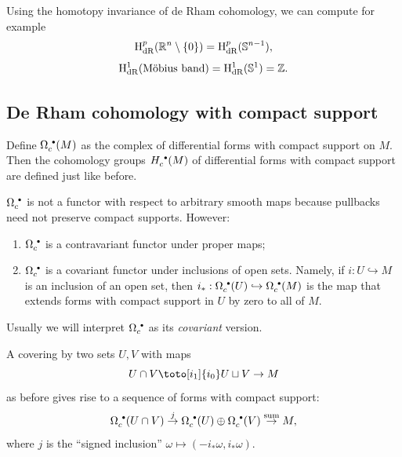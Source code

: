 \begin{xca}
    Using the homotopy invariance of de Rham cohomology, we can compute for example
    \[\mathrm{H}^p_{\rm dR}(\mathbb{R}^n\setminus\{0\})=\mathrm{H}^p_{\rm dR}(\mathbb{S}^{n-1}),\]
    \[\mathrm{H}^1_{\rm dR}(\text{M\"obius band})=\mathrm{H}^1_{\rm dR}(\mathbb{S}^1)=\mathbb{Z}.\]
\end{xca}

\subsection{De Rham cohomology with compact support}

\begin{defn}
    Define $\Omega_c^{\smbullet }(M)$ as the complex of differential forms with compact support on $M$. Then the cohomology groups $H_c^{\smbullet }(M)$ of differential forms with compact support are defined just like before.
\end{defn}

\begin{prop}
    $\Omega_c^{\smbullet }$ is not a functor with respect to arbitrary smooth maps because pullbacks need not preserve compact supports. However:
    \begin{enumerate}
        \item $\Omega_c^{\smbullet }$ is a contravariant functor under proper maps;
        \item $\Omega_c^{\smbullet }$ is a covariant functor under inclusions of open sets. Namely, if $i:U\hookrightarrow M$ is an inclusion of an open set, then $i_\ast:\Omega_c^{\smbullet }(U)\hookrightarrow\Omega_c^{\smbullet }(M)$ is the map that extends forms with compact support in $U$ by zero to all of $M$.
    \end{enumerate}
\end{prop}
Usually we will interpret $\Omega_c^{\smbullet }$ as its \emph{covariant} version.

A covering by two sets $U,V$ with maps 
\[U\cap V\toto[i_1]{i_0}U\sqcup V\to M \]
as before gives rise to a sequence of forms with compact support:
\[\Omega_c^{\smbullet }(U\cap V)\overset{j}{\to} \Omega_c^{\smbullet }(U)\oplus\Omega_c^{\smbullet }(V)\overset{\text{sum}}\to M ,\]
where $j$ is the ``signed inclusion'' $\omega\mapsto (-i_\ast \omega,i_\ast\omega)$.

